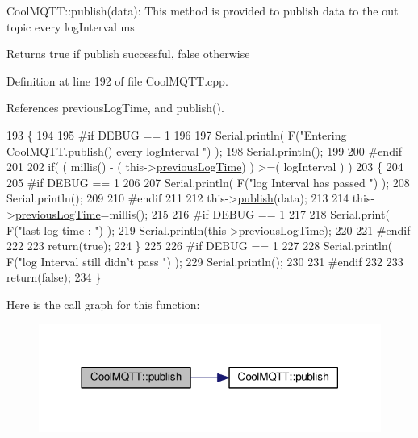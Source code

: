 Cool\+M\+Q\+T\+T\+::publish(data)\+: This method is provided to publish data to the out topic every log\+Interval ms

\begin{DoxyReturn}{Returns}
true if publish successful, false otherwise 
\end{DoxyReturn}


Definition at line 192 of file Cool\+M\+Q\+T\+T.\+cpp.



References previous\+Log\+Time, and publish().


\begin{DoxyCode}
193 \{
194 
195 \textcolor{preprocessor}{#if DEBUG == 1 }
196 
197     Serial.println( F(\textcolor{stringliteral}{"Entering CoolMQTT.publish() every logInterval "}) );
198     Serial.println();
199 
200 \textcolor{preprocessor}{#endif }
201     
202     \textcolor{keywordflow}{if}( ( millis() - ( this->\hyperlink{classCoolMQTT_a3db37ef9ed3b05b2a8d44edba0e7d3cc}{previousLogTime})  ) >=( logInterval ) )
203     \{
204     
205 \textcolor{preprocessor}{    #if DEBUG == 1}
206 
207         Serial.println( F(\textcolor{stringliteral}{"log Interval has passed "}) );
208         Serial.println();
209     
210 \textcolor{preprocessor}{    #endif}
211 
212         this->\hyperlink{classCoolMQTT_ace977b3e90ab14b1199fe5c4fb0a13ec}{publish}(data);
213 
214         this->\hyperlink{classCoolMQTT_a3db37ef9ed3b05b2a8d44edba0e7d3cc}{previousLogTime}=millis();
215     
216 \textcolor{preprocessor}{    #if DEBUG == 1 }
217 
218         Serial.print( F(\textcolor{stringliteral}{"last log time : "}) );
219         Serial.println(this->\hyperlink{classCoolMQTT_a3db37ef9ed3b05b2a8d44edba0e7d3cc}{previousLogTime});
220 
221 \textcolor{preprocessor}{    #endif}
222 
223         \textcolor{keywordflow}{return}(\textcolor{keyword}{true});
224     \}
225 
226 \textcolor{preprocessor}{#if DEBUG == 1 }
227 
228     Serial.println( F(\textcolor{stringliteral}{"log Interval still didn't pass "}) ); 
229     Serial.println();
230 
231 \textcolor{preprocessor}{#endif}
232 
233     \textcolor{keywordflow}{return}(\textcolor{keyword}{false});
234 \}
\end{DoxyCode}
Here is the call graph for this function\+:
\nopagebreak
\begin{figure}[H]
\begin{center}
\leavevmode
\includegraphics[width=318pt]{classCoolMQTT_a65a506641740ce797ceadd4fa8a286d3_cgraph}
\end{center}
\end{figure}
\mbox{\label{classCoolMQTT_ae3c18f6ae9723746d32765f1c8f176ca}} 
